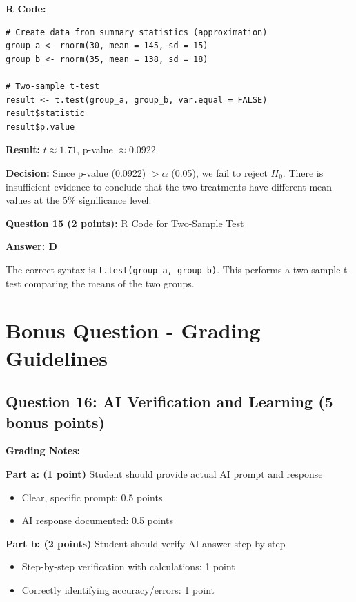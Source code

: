 \documentclass[11pt]{article}
\begin{document}
\textbf{R Code:}
\begin{verbatim}
# Create data from summary statistics (approximation)
group_a <- rnorm(30, mean = 145, sd = 15)
group_b <- rnorm(35, mean = 138, sd = 18)

# Two-sample t-test
result <- t.test(group_a, group_b, var.equal = FALSE)
result$statistic
result$p.value
\end{verbatim}

\textbf{Result:} $t \approx 1.71$, p-value $\approx 0.0922$

\textbf{Decision:} Since p-value (0.0922) $> \alpha$ (0.05), we fail to reject $H_0$. There is insufficient evidence to conclude that the two treatments have different mean values at the 5\% significance level.

\vspace{0.5cm}

\textbf{Question 15 (2 points):} R Code for Two-Sample Test

\textcolor{correctgreen}{\textbf{Answer: D}}

The correct syntax is \texttt{t.test(group\_a, group\_b)}. This performs a two-sample t-test comparing the means of the two groups.

\newpage

\section*{Bonus Question - Grading Guidelines}

\subsection*{Question 16: AI Verification and Learning (5 bonus points)}

\textcolor{correctgreen}{\textbf{Grading Notes:}}

\textbf{Part a: (1 point)} Student should provide actual AI prompt and response
\begin{itemize}
\item Clear, specific prompt: 0.5 points
\item AI response documented: 0.5 points
\end{itemize}

\textbf{Part b: (2 points)} Student should verify AI answer step-by-step
\begin{itemize}
\item Step-by-step verification with calculations: 1 point
\item Correctly identifying accuracy/errors: 1 point
\end{itemize}
\end{document}
